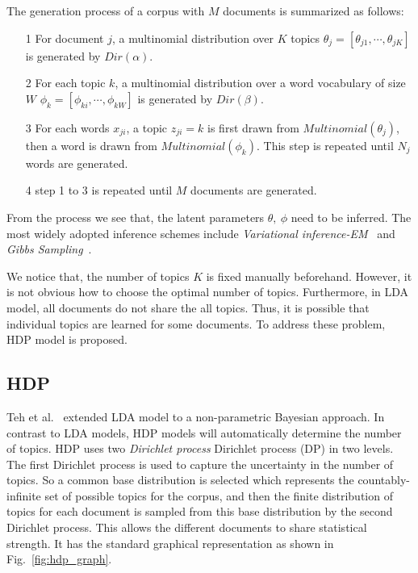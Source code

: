 The generation process of a corpus with $M$ documents is summarized as follows:
\begin{itemize}
	\item[1] For document $j$, a multinomial distribution over $K$ topics $\theta_j = [\theta_{j1},\cdots,\theta_{jK}]$ is generated by $Dir(\alpha)$.
	\item[2] For each topic $k$, a multinomial distribution over a word vocabulary of size $W$ $\phi_k=[\phi_{ki},\cdots,\phi_{kW}]$ is generated by $Dir(\beta)$.
	\item[3] For each words $x_{ji}$, a topic $z_{ji}=k$ is first drawn from $Multinomial(\theta_j)$, then a word is drawn from $Multinomial(\phi_k)$. This step is repeated until $N_j$ words are generated.
	\item[4] step 1 to 3 is repeated until $M$ documents are generated.
\end{itemize}

From the process we see that, the latent parameters $\theta,~\phi $ need to be inferred. The most widely adopted inference schemes include \emph{Variational inference-EM}~\cite{blei2006variational} and \emph{Gibbs Sampling}~\cite{casella1992explaining}.

We notice that, the number of topics $K$ is fixed manually beforehand. However, it is not obvious how to choose the optimal number of topics. Furthermore, in LDA model, all documents do not share the all topics. Thus, it is possible that individual topics are learned for some documents. To address these problem, HDP model is proposed.

\subsection{HDP}
\label{bg:hdp}
Teh et al.~\cite{teh2006hdp} extended LDA model to a non-parametric Bayesian approach. In contrast to LDA models, HDP models will automatically determine the number of topics.
HDP uses two \emph{Dirichlet process} Dirichlet process (DP) in two levels. The first Dirichlet process is used to capture the uncertainty in the number of topics. So a common base distribution is selected which represents the countably-infinite set of possible topics for the corpus, and then the finite distribution of topics for each document is sampled from this base distribution by the second Dirichlet process. This allows the different documents to share statistical strength.
It has the standard graphical representation as shown in Fig.~\ref{fig:hdp_graph}.

